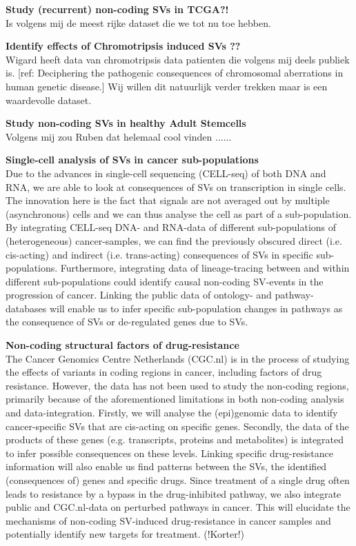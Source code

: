 \documentclass[twoside,fontsize=12pt]{article}
\begin{document}
\noindent
\textbf{Study (recurrent) non-coding SVs in TCGA?!} \\
Is volgens mij de meest rijke dataset die we tot nu toe hebben.
\medskip

\noindent
\textbf{Identify effects of Chromotripsis induced SVs ??} \\
Wigard heeft data van chromotripsis data patienten die volgens mij deels publiek is.
[ref: Deciphering the pathogenic consequences of chromosomal aberrations in human genetic disease.]
Wij willen dit natuurlijk verder trekken maar is een waardevolle dataset.
\medskip

\noindent
\textbf{Study non-coding SVs in healthy Adult Stemcells} \\
Volgens mij zou Ruben dat helemaal cool vinden ......
\medskip

\noindent
\textbf{Single-cell analysis of SVs in cancer sub-populations} \\
Due to the advances in single-cell sequencing (CELL-seq) of both DNA and RNA, we are able to look at consequences of SVs on transcription in single cells. The innovation here is the fact that signals are not averaged out by multiple (asynchronous) cells and we can thus analyse the cell as part of a sub-population. By integrating CELL-seq DNA- and RNA-data of different sub-populations of (heterogeneous) cancer-samples, we can find the previously obscured direct (i.e. cis-acting) and indirect (i.e. trans-acting) consequences of SVs in specific sub-populations. Furthermore, integrating data of lineage-tracing between and within different sub-populations could identify causal non-coding SV-events in the progression of cancer. Linking the public data of ontology- and pathway-databases will enable us to infer specific sub-population changes in pathways as the consequence of SVs or de-regulated genes due to SVs.
\medskip

\noindent
\textbf{Non-coding structural factors of drug-resistance} \\
The Cancer Genomics Centre Netherlands (CGC.nl) is in the process of studying the effects of variants in coding regions in cancer, including factors of drug resistance. However, the data has not been used to study the non-coding regions, primarily because of the aforementioned limitations in both non-coding analysis and data-integration. Firstly, we will analyse the (epi)genomic data to identify cancer-specific SVs that are cis-acting on specific genes. Secondly, the data of the products of these genes (e.g. transcripts, proteins and metabolites) is integrated to infer possible consequences on these levels. Linking specific drug-resistance information will also enable us find patterns between the SVs, the identified (consequences of) genes and specific drugs. Since treatment of a single drug often leads to resistance by a bypass in the drug-inhibited pathway\cite{Prahallad2012}, we also integrate public and CGC.nl-data on perturbed pathways in cancer. This will elucidate the mechanisms of non-coding SV-induced drug-resistance in cancer samples and potentially identify new targets for treatment. (!Korter!)
\end{document}
